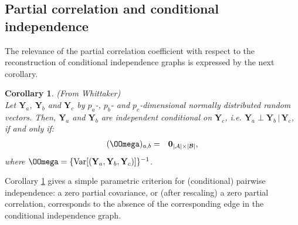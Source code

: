 \documentclass[a4paper]{article}
\theoremstyle{myexamplestyle}
\newtheorem{coro}{Corollary}
\begin{document}
\subsection{Partial correlation and conditional independence}
The relevance of the partial correlation coefficient with respect to the reconstruction of conditional independence graphs is expressed by the next corollary.

\begin{coro} \label{cor.parametricIndependenceCriterion} (From Whittaker)
\\
Let $\mathbf{Y}_{a}$, $\mathbf{Y}_{b}$ and $\mathbf{Y}_{c}$ by $p_a$-, $p_b$- and $p_c$-dimensional normally distributed random vectors. Then,  $\mathbf{Y}_{a}$ and $\mathbf{Y}_{b}$ 
are independent conditional on $\mathbf{Y}_{c}$, i.e.  $\mathbf{Y}_{a} \perp \mathbf{Y}_{b} \, | \,  \mathbf{Y}_{c}$, if and only if:
\begin{eqnarray*}  
(\OOmega)_{a,b} & = & \mathbf{0}_{|\mathcal{A}| \times |\mathcal{B}|},
\end{eqnarray*}
where $\OOmega = \{ \mbox{Var}[ (\mathbf{Y}_a, \mathbf{Y}_b, \mathbf{Y}_c)] \}^{-1}$.
\end{coro}

Corollary \ref{cor.parametricIndependenceCriterion} gives a simple parametric criterion for (conditional) pairwise independence: a zero partial covariance, or (after rescaling) a zero partial correlation, corresponds to the absence of the corresponding edge in the conditional independence graph.  
\end{document}
